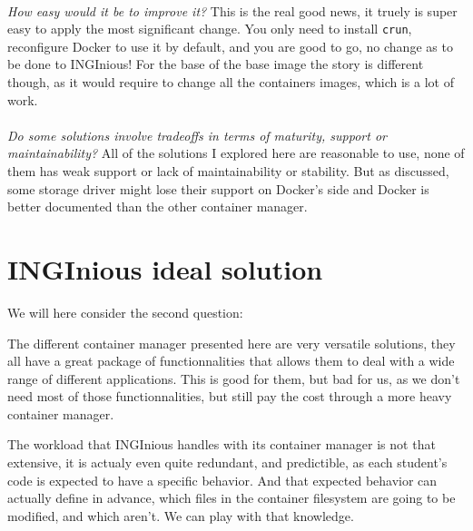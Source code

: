 \paragraph{}\textit{How easy would it be to improve it?}  This is the real good news, it truely is super easy to apply the most significant change.  You only need to install \texttt{crun}, reconfigure Docker to use it by default, and you are good to go, no change as to be done to INGInious!  For the base of the base image the story is different though, as it would require to change all the containers images, which is a lot of work.
\paragraph{}\textit{Do some solutions involve tradeoffs in terms of maturity, support or maintainability?}  All of the solutions I explored here are reasonable to use, none of them has weak support or lack of maintainability or stability.  But as discussed, some storage driver might lose their support on Docker's side and Docker is better documented than the other container manager.

\section{INGInious ideal solution}
We will here consider the second question:
\begin{center}
\end{center}

The different container manager presented here are very versatile solutions, they all have a great package of functionnalities that allows them to deal with a wide range of different applications.  This is good for them, but bad for us, as we don't need most of those functionnalities, but still pay the cost through a more heavy container manager.

The workload that INGInious handles with its container manager is not that extensive, it is actualy even quite redundant, and predictible, as each student's code is expected to have a specific behavior.  And that expected behavior can actually define in advance, which files in the container filesystem are going to be modified, and which aren't.  We can play with that knowledge.

